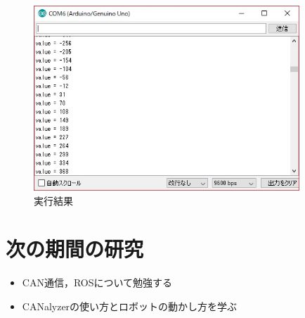 \documentclass[a4j，10pt]{jarticle}
\begin{document}
\begin{figure}[htbp]
	\begin{center}
      \includegraphics[width=10cm,bb=0 0 529 368]{ex.jpg}
        \caption{実行結果}
        \label{ラベル3}
     \end{center}
\end{figure}















\section{次の期間の研究}
\begin{itemize}
\item{CAN通信，ROSについて勉強する}
\item{CANalyzerの使い方とロボットの動かし方を学ぶ}
\end{itemize}


\end{document}
